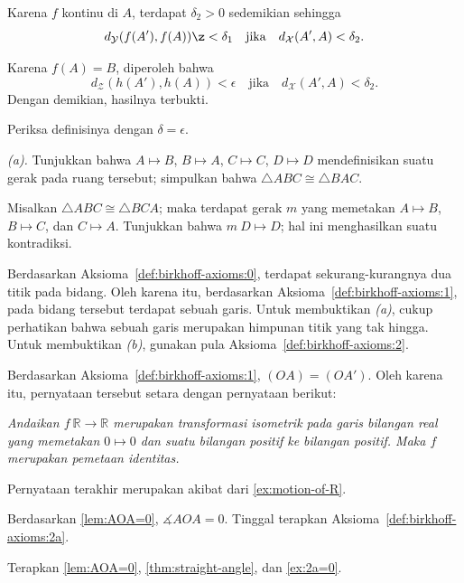 Karena $f$ kontinu di $A$, terdapat $\delta_2>0$ sedemikian sehingga 
$$d_{\mathcal{Y}}(f(A'),f(A))\z<\delta_1
\quad
\text{jika}
\quad
d_{\mathcal{X}}(A',A)<\delta_2.$$ 

Karena $f(A)=B$, diperoleh bahwa
$$d_{\mathcal{Z}}(h(A'),h(A))<\epsilon
\quad
\text{jika}
\quad
d_{\mathcal{X}}(A',A)<\delta_2.$$ 
Dengan demikian, hasilnya terbukti.

Periksa definisinya dengan $\delta=\epsilon$.

 \textit{(a).}
Tunjukkan bahwa $A\mapsto B$, $B\mapsto A$, $C\mapsto C$, $D\mapsto D$ mendefinisikan suatu gerak pada ruang tersebut;
simpulkan bahwa $\triangle ABC\cong \triangle BAC$.

 Misalkan $\triangle ABC\cong \triangle BCA$; maka terdapat gerak $m$ yang memetakan $A\mapsto B$, $B\mapsto C$, dan $C\mapsto A$.
Tunjukkan bahwa $m\:D\mapsto D$; hal ini menghasilkan suatu kontradiksi.


\setcounter{eqtn}{0}

 Berdasarkan Aksioma~\ref{def:birkhoff-axioms:0}, terdapat sekurang-kurangnya dua titik pada bidang.
Oleh karena itu, berdasarkan Aksioma~\ref{def:birkhoff-axioms:1},
pada bidang tersebut terdapat sebuah garis.
Untuk membuktikan \textit{(a)}, cukup perhatikan bahwa sebuah garis merupakan himpunan titik yang tak hingga.
Untuk membuktikan \textit{(b)}, gunakan pula Aksioma~\ref{def:birkhoff-axioms:2}.

\parbf{\ref{ex:[OA)=[OA')}.}
Berdasarkan Aksioma~\ref{def:birkhoff-axioms:1},
$(OA)=(OA')$.
Oleh karena itu, pernyataan tersebut setara dengan pernyataan berikut:

\textit{Andaikan $f\:\mathbb{R}\to \mathbb{R}$ merupakan transformasi isometrik pada garis bilangan real yang memetakan $0\mapsto 0$ dan suatu bilangan positif ke bilangan positif.
Maka $f$ merupakan pemetaan identitas.}

Pernyataan terakhir merupakan akibat dari \ref{ex:motion-of-R}.

\parbf{\ref{ex:[OA)=[OB)}.}
Berdasarkan \ref{lem:AOA=0},
$\measuredangle AOA=0$.
Tinggal terapkan Aksioma~\ref{def:birkhoff-axioms:2a}.

Terapkan \ref{lem:AOA=0},
\ref{thm:straight-angle},
dan \ref{ex:2a=0}.

